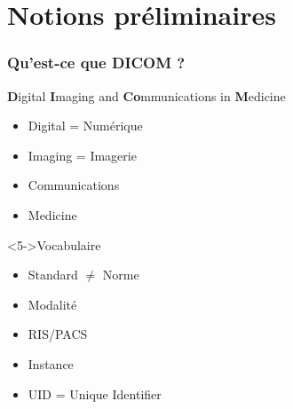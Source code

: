 \section{Notions pr\'eliminaires}

	\frame
	{
		\frametitle{Qu'est-ce que DICOM ?}
		
		\begin{block}{\textbf{D}igital \textbf{I}maging and \textbf{Co}mmunications in \textbf{M}edicine}
			\begin{itemize}
				\item<2-> Digital = Num\'erique
		    	\item<2-> Imaging = Imagerie
		    	\item<3-> Communications
		    	\item<4-> Medicine
			\end{itemize}
		\end{block}
		
		\begin{block}<5->{Vocabulaire}
		\begin{itemize}
			\item<6-> Standard $\neq$ Norme
			\item<7-> Modalit\'e
			\item<8-> RIS/PACS
			\item<9-> Instance
			\item<10-> UID = Unique Identifier
		\end{itemize}
		\end{block}
	}
	
